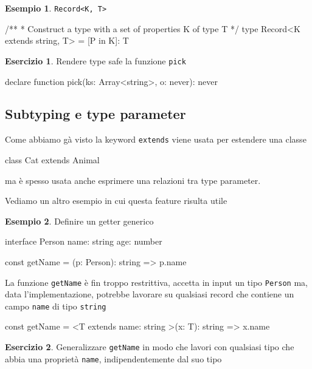 \documentclass[12pt]{article}
\theoremstyle{definition}
\newtheorem{example}{Esempio}[subsection]
\newtheorem{exercise}{Esercizio}[subsection]
\newenvironment{code}
  {\vspace{0.5cm} \VerbatimEnvironment\begin{typescriptcode}}
  {\end{typescriptcode} \vspace{0.2cm}}
\begin{document}
\begin{example}
\texttt{Record<K, T>}

\begin{code}
/**
 * Construct a type with a set of properties K of type T
 */
type Record<K extends string, T> = { [P in K]: T }
\end{code}
\end{example}

\begin{exercise}
Rendere type safe la funzione \texttt{pick}

\begin{code}
declare function pick(ks: Array<string>, o: never): never
\end{code}
\end{exercise}

\subsection{Subtyping e type parameter}

Come abbiamo gà visto la keyword \texttt{extends} viene usata per estendere una classe

\begin{code}
class Cat extends Animal {}
\end{code}

ma è spesso usata anche esprimere una relazioni tra type parameter.

Vediamo un altro esempio in cui questa feature risulta utile

\begin{example}
Definire un getter generico

\begin{code}
interface Person {
  name: string
  age: number
}

const getName = (p: Person): string => p.name
\end{code}

La funzione \texttt{getName} è fin troppo restrittiva, accetta in input un tipo \texttt{Person} ma, data l'implementazione,
potrebbe lavorare su qualsiasi record che contiene un campo \texttt{name} di tipo \texttt{string}

\begin{code}
const getName = <T extends { name: string }>(x: T): string =>
  x.name
\end{code}
\end{example}

\begin{exercise}
Generalizzare \texttt{getName} in modo che lavori con qualsiasi tipo che abbia una proprietà \texttt{name},
indipendentemente dal suo tipo
\end{exercise}
\end{document}
